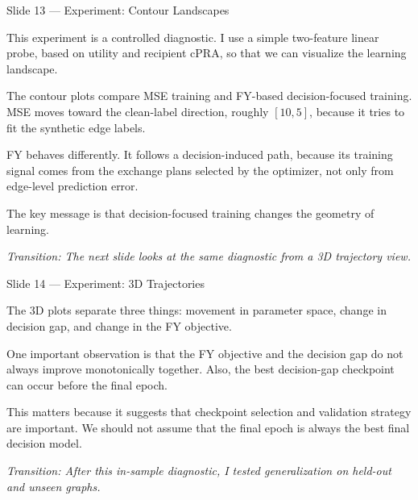 \documentclass[11pt, aspectratio=169]{beamer}
\newcommand{\tr}[1]{\vspace{0.35em}\textit{\textcolor{black!55}{Transition: #1}}}
\newcommand{\timing}[1]{}
\begin{document}
\begin{frame}{Slide 13 \enspace\textmd{\small\textcolor{black!40}{--- Experiment: Contour Landscapes}}}
\small
\timing{45 seconds}

This experiment is a controlled diagnostic. I use a simple two-feature linear
probe, based on utility and recipient cPRA, so that we can visualize the learning
landscape.

\vspace{0.35em}
The contour plots compare MSE training and FY-based decision-focused training.
MSE moves toward the clean-label direction, roughly \([10,5]\), because it tries
to fit the synthetic edge labels.

\vspace{0.35em}
FY behaves differently. It follows a decision-induced path, because its training
signal comes from the exchange plans selected by the optimizer, not only from
edge-level prediction error.

\vspace{0.35em}
The key message is that decision-focused training changes the geometry of
learning.

\tr{The next slide looks at the same diagnostic from a 3D trajectory view.}
\end{frame}

\begin{frame}{Slide 14 \enspace\textmd{\small\textcolor{black!40}{--- Experiment: 3D Trajectories}}}
\small
\timing{35 seconds}

The 3D plots separate three things: movement in parameter space, change in
decision gap, and change in the FY objective.

\vspace{0.35em}
One important observation is that the FY objective and the decision gap do not
always improve monotonically together. Also, the best decision-gap checkpoint can
occur before the final epoch.

\vspace{0.35em}
This matters because it suggests that checkpoint selection and validation
strategy are important. We should not assume that the final epoch is always the
best final decision model.

\tr{After this in-sample diagnostic, I tested generalization on held-out and unseen graphs.}
\end{frame}
\end{document}
